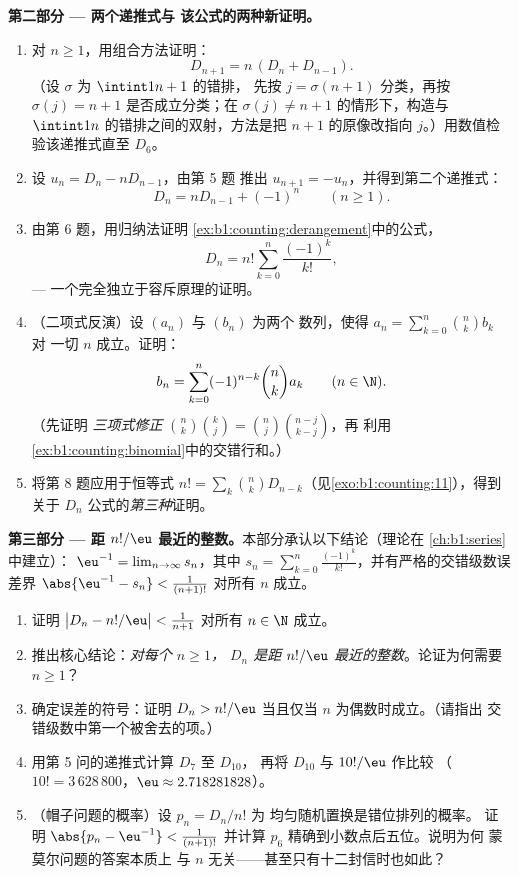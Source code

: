 \begin{problem}
\medskip
\noindent\textbf{第二部分 --- 两个递推式与
该公式的两种新证明。}
\begin{enumerate}[resume]
  \item 对 $n \geq 1$，用组合方法证明：
        \[
        D_{n+1} = n\,(D_n + D_{n-1}) .
        \]
        （设 $\sigma$ 为 $\intint1{n+1}$ 的错排，
        先按 $j = \sigma(n+1)$ 分类，再按 $\sigma(j) = n + 1$ 是否成立分类；在
        $\sigma(j) \neq n+1$ 的情形下，构造与
        $\intint1n$ 的错排之间的双射，方法是把
        $n + 1$ 的原像改指向 $j$。）用数值检验该递推式直至
        $D_6$。
  \item 设 $u_n = D_n - n D_{n-1}$，由第 5 题
        推出 $u_{n+1} = -u_n$，并得到第二个递推式：
        \[
        D_n = n D_{n-1} + (-1)^n \qquad (n \geq 1).
        \]
  \item 由第 6 题，用归纳法证明
        \cref{ex:b1:counting:derangement}中的公式，
        \[
        D_n = n! \sum_{k=0}^{n} \frac{(-1)^k}{k!},
        \]
        --- 一个完全独立于容斥原理的证明。
  \item （二项式反演）设 $(a_n)$ 与 $(b_n)$ 为两个
        数列，使得 $a_n = \sum_{k=0}^n \binom nk b_k$ 对
        一切 $n$ 成立。证明：
        \[
        b_n = \sum_{k=0}^{n} (-1)^{n-k} \binom nk a_k
        \qquad (n \in \N).
        \]
        （先证明 \emph{三项式修正}
        $\binom nk \binom kj = \binom nj \binom{n-j}{k-j}$，再
        利用
        \cref{ex:b1:counting:binomial}中的交错行和。）
  \item 将第 8 题应用于恒等式 $n! = \sum_k \binom nk
        D_{n-k}$（见\cref{exo:b1:counting:11}），得到
        关于 $D_n$ 公式的\emph{第三种}证明。
\end{enumerate}

\medskip
\noindent\textbf{第三部分 --- 距
$n!/\eu$ 最近的整数。}本部分承认以下结论（理论在
\cref{ch:b1:series}中建立）：
$\eu^{-1} = \lim_{n \to \infty} s_n$，其中 $s_n = \sum_{k=0}^{n}
\frac{(-1)^k}{k!}$，并有严格的交错级数误差界
$\abs{\eu^{-1} - s_n} < \frac1{(n+1)!}$ 对所有 $n$ 成立。
\begin{enumerate}[resume]
  \item 证明 $\bigl| D_n - n!/\eu \bigr| < \frac1{n+1}$
        对所有 $n \in \N$ 成立。
  \item 推出核心结论：\emph{对每个 $n \geq 1$，
        $D_n$ 是距 $n!/\eu$ 最近的整数}。论证为何需要
        $n \geq 1$？
  \item 确定误差的符号：证明 $D_n > n!/\eu$
        当且仅当 $n$ 为偶数时成立。（请指出
        交错级数中第一个被舍去的项。）
  \item 用第 5 问的递推式计算 $D_7$ 至 $D_{10}$，
        再将 $D_{10}$ 与 $10!/\eu$ 作比较
        （$10! = 3\,628\,800$，$\eu \approx 2.718281828$）。
  \item （帽子问题的概率）设 $p_n = D_n/n!$ 为
        均匀随机置换是错位排列的概率。
        证明 $\abs{p_n - \eu^{-1}} < \frac1{(n+1)!}$
        并计算 $p_6$ 精确到小数点后五位。说明为何
        蒙莫尔问题的答案本质上
        与 $n$ 无关——甚至只有十二封信时也如此？
\end{enumerate}


\end{problem}

